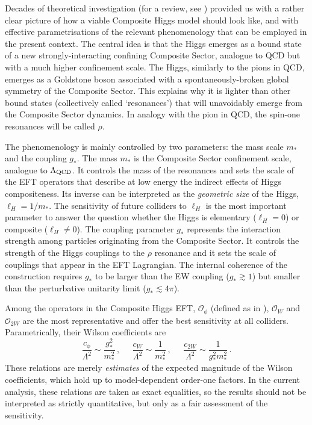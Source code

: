 \documentclass[../report.tex]{subfiles}
\begin{document}
Decades of theoretical investigation (for a review, see \cite{Panico:2015jxa}) provided us with a rather clear picture of how a viable Composite Higgs model should look like, and with effective parametrisations of the relevant phenomenology that can be employed in the present context. The central idea is that the Higgs emerges as a bound state of a new strongly-interacting confining Composite Sector, analogue to QCD but with a much higher confinement scale. The Higgs, similarly to the pions in QCD, emerges as a Goldstone boson associated with a spontaneously-broken global symmetry of the Composite Sector. This explains why it is lighter than other bound states (collectively called `resonances') that will unavoidably emerge from the Composite Sector dynamics. In analogy with the pion in QCD, the spin-one resonances will be called $\rho$.

The phenomenology is mainly controlled by two parameters: the mass scale $m_*$ and the coupling $g_*$. The mass $m_*$ is the Composite Sector confinement scale, analogue to $\Lambda_{\rm{QCD}}$. It controls the mass of the resonances and sets the scale of the EFT operators that describe at low energy the indirect effects of Higgs compositeness. Its inverse can be interpreted as the \emph{geometric size} of the Higgs, $\ell_H=1/m_*$. The sensitivity of future colliders to $\ell_H$ is the most important parameter to answer the question whether the Higgs is elementary ($\ell_H=0$) or composite ($\ell_H\neq0$). The coupling parameter $g_*$ represents the interaction strength among particles originating from the Composite Sector. It controls the strength of the Higgs couplings to the $\rho$ resonance and it sets the scale of couplings that appear in the EFT Lagrangian. The internal coherence of the construction requires $g_*$ to be larger than the EW coupling ($g_*\gtrsim 1$) but smaller than the perturbative unitarity limit ($g_*\lesssim 4\pi$). 

Among the operators in the Composite Higgs EFT,  $\mathcal{O}_{\phi}$ (defined as in \cite{deBlas:2019rxi}), $\mathcal{O}_{W}$ and $\mathcal{O}_{2W}$ are the most representative and offer the best sensitivity at all colliders. Parametrically, their Wilson coefficients are
\begin{equation}\label{eq:CHOp}
\frac{c_{\phi}}{\Lambda^2}\sim \frac{g_*^2}{m_*^2}\,,\;\;\;\;\;
\frac{c_{W}}{\Lambda^2}\sim \frac{1}{m_*^2}\,,\;\;\;\;\;
\frac{c_{2W}}{\Lambda^2}\sim \frac{1}{g_*^2m_*^2}\,.
\nonumber
\end{equation}
These relations are merely \emph{estimates} of the expected magnitude of the Wilson coefficients, which hold up to model-dependent order-one factors. In the current analysis, these relations are taken as exact equalities, so the results should not be interpreted as strictly quantitative, but only as a fair assessment of the sensitivity. 
\end{document}
